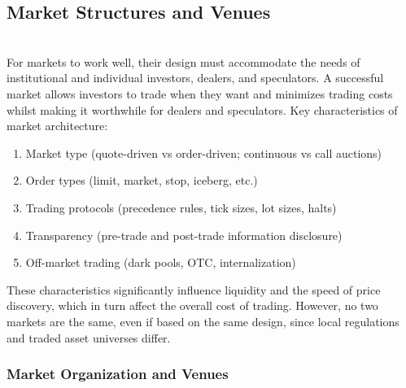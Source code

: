 
\subsection{Market Structures and Venues}

\begin{remark} \\
For markets to work well, their design must accommodate the needs of institutional and individual investors, dealers, and speculators. A successful market allows investors to trade when they want and minimizes trading costs whilst making it worthwhile for dealers and speculators. Key characteristics of market architecture:
\begin{enumerate}[label=\roman*.]
\setlength{\itemsep}{0pt}
\item Market type (quote-driven vs order-driven; continuous vs call auctions)
\item Order types (limit, market, stop, iceberg, etc.)
\item Trading protocols (precedence rules, tick sizes, lot sizes, halts)
\item Transparency (pre-trade and post-trade information disclosure)
\item Off-market trading (dark pools, OTC, internalization)
\end{enumerate}
These characteristics significantly influence liquidity and the speed of price discovery, which in turn affect the overall cost of trading. However, no two markets are the same, even if based on the same design, since local regulations and traded asset universes differ.
\end{remark}

\subsubsection{Market Organization and Venues}

